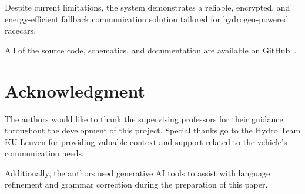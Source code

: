 \documentclass[conference]{IEEEtran}
\begin{document}
Despite current limitations, the system demonstrates a reliable, encrypted, and energy-efficient fallback communication solution tailored for hydrogen-powered racecars.

All of the source code, schematics, and documentation are available on GitHub~\cite{Hydro Backup System - Organization}.

\section*{Acknowledgment}
The authors would like to thank the supervising professors for their guidance throughout the development of this project. Special thanks go to the Hydro Team KU Leuven for providing valuable context and support related to the vehicle's communication needs. 

Additionally, the authors used generative AI tools to assist with language refinement and grammar correction during the preparation of this paper.


\end{document}
